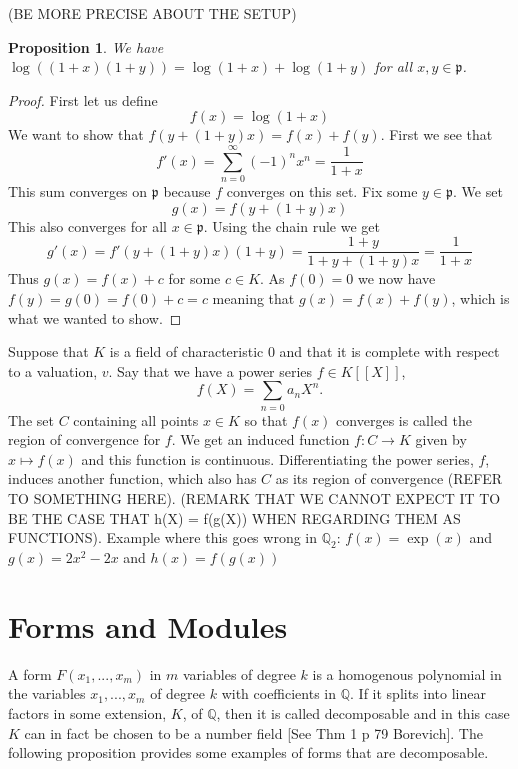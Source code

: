 \documentclass{article}
\newtheorem{proposition}{Proposition}[section]
\newcommand{\mfrak}[1]{\mathfrak{#1}}
\newcommand{\mbb}[1]{\mathbb{#1}}
\begin{document}
(BE MORE PRECISE ABOUT THE SETUP)
\begin{proposition}
    We have $\log((1+x)(1+y)) = \log(1+x) + \log(1+y)$
    for all $x,y \in \mfrak p$. 
\end{proposition}
\begin{proof}
    First let us define 
    $$f(x) = \log(1+x)$$
    We want to show that $f(y + (1 + y)x) = f(x) + f(y)$. First we see that
    $$f'(x) = \sum_{n = 0}^\infty (-1)^n x^n = \frac{1}{1+x}$$
    This sum converges on $\mfrak p$ because $f$ converges on this set. Fix some $y \in \mfrak p$. We set
    $$g(x) = f(y + (1 + y)x)$$
    This also converges for all $x \in \mfrak p$. Using the chain rule we get
    $$g'(x) = f'(y + (1 + y)x)(1 + y) = \frac{1+y}{1+y + (1+y)x} = \frac{1}{1+x}$$
    Thus $g(x) = f(x) + c$ for some $c \in K$. As $f(0) = 0$ we now have $f(y) = g(0) = f(0) + c = c$ meaning that $g(x) = f(x) + f(y)$, which is what we wanted to show. 
\end{proof}




Suppose that $K$ is a field of characteristic 0 and that it is complete with respect to a valuation, $v$. Say that we have a power series $f \in K[[X]]$,  
$$f(X) = \sum_{n = 0} a_n X^n.$$
The set $C$ containing all points $x \in K$ so that $f(x)$ converges is called the region of convergence for $f$. 
We get an induced function $f : C \to K$ given by $x \mapsto f(x)$ and this function is continuous. Differentiating the power series, $f$, induces another function, which also has $C$ as its region of convergence (REFER TO SOMETHING HERE). (REMARK THAT WE CANNOT EXPECT IT TO BE THE CASE THAT h(X) = f(g(X)) WHEN REGARDING THEM AS FUNCTIONS). Example where this goes wrong in $\mbb Q_2$: $f(x) = \exp(x)$ and $g(x) = 2x^2 - 2x$ and $h(x) = f(g(x))$

\section{Forms and Modules}
A form $F(x_1, ..., x_m)$ in $m$ variables of degree $k$ is a homogenous polynomial in the variables $x_1, ..., x_m$ of degree $k$ with coefficients in $\mbb{Q}$. If it splits into linear factors in some extension, $K$, of $\mbb{Q}$, then it is called decomposable and in this case $K$ can in fact be chosen to be a number field [See Thm 1 p 79 Borevich]. The following proposition provides some examples of forms that are decomposable.
\end{document}
